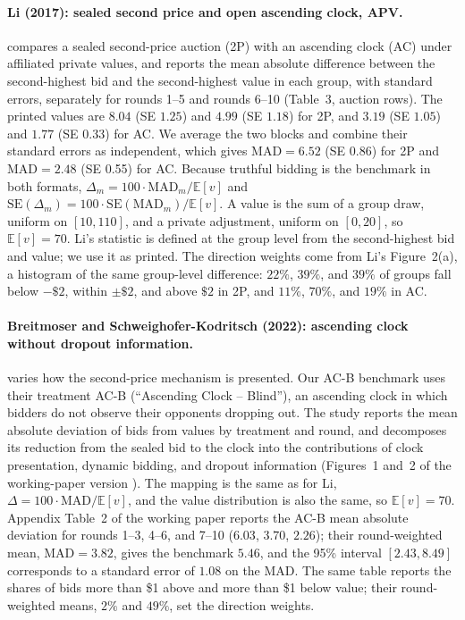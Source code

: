 \documentclass[acmsmall,screen,review]{acmart}
\newcommand{\rev}[1]{{\color{blue}#1}}
\newenvironment{revblock}{\color{blue}}{}
\newcommand{\rev}[1]{#1}
\newenvironment{revblock}{}{}
\begin{document}
\begin{revblock}
\paragraph{Li (2017): sealed second price and open ascending clock, APV.}
\citet{li2017obviously} compares a sealed second-price auction (2P) with an ascending clock (AC) under affiliated private values, and reports the mean absolute difference between the second-highest bid and the second-highest value in each group, with standard errors, separately for rounds 1--5 and rounds 6--10 (Table~3, auction rows). The printed values are $8.04$ (SE $1.25$) and $4.99$ (SE $1.18$) for 2P, and $3.19$ (SE $1.05$) and $1.77$ (SE $0.33$) for AC. We average the two blocks and combine their standard errors as independent, which gives $\mathrm{MAD}=6.52$ (SE 0.86) for 2P and $\mathrm{MAD}=2.48$ (SE 0.55) for AC. Because truthful bidding is the benchmark in both formats, $\Delta_m=100\cdot\mathrm{MAD}_m/\mathbb{E}[v]$ and $\mathrm{SE}(\Delta_m)=100\cdot\mathrm{SE}(\mathrm{MAD}_m)/\mathbb{E}[v]$. A value is the sum of a group draw, uniform on $[10,110]$, and a private adjustment, uniform on $[0,20]$, so $\mathbb{E}[v]=70$. Li's statistic is defined at the group level from the second-highest bid and value; we use it as printed. \rev{The direction weights come from Li's Figure~2(a), a histogram of the same group-level difference: $22\%$, $39\%$, and $39\%$ of groups fall below $-\$2$, within $\pm\$2$, and above $\$2$ in 2P, and $11\%$, $70\%$, and $19\%$ in AC.}

\paragraph{Breitmoser and Schweighofer-Kodritsch (2022): ascending clock without dropout information.}
\citet{breitmoser2022obviousness} varies how the second-price mechanism is presented. Our AC-B benchmark uses their treatment AC-B (``Ascending Clock -- Blind''), an ascending clock in which bidders do not observe their opponents dropping out. The study reports the mean absolute deviation of bids from values by treatment and round, and decomposes its reduction from the sealed bid to the clock into the contributions of clock presentation, dynamic bidding, and dropout information (Figures~1 and~2 of the working-paper version \citep{breitmoser2019obviousness}). The mapping is the same as for Li, $\Delta=100\cdot\mathrm{MAD}/\mathbb{E}[v]$, and the value distribution is also the same, so $\mathbb{E}[v]=70$. Appendix Table~2 of the working paper reports the AC-B mean absolute deviation for rounds 1--3, 4--6, and 7--10 ($6.03$, $3.70$, $2.26$); their round-weighted mean, $\mathrm{MAD}=3.82$, gives the benchmark $5.46$, and the 95\% interval $[2.43, 8.49]$ corresponds to a standard error of $1.08$ on the MAD. The same table reports the shares of bids more than \$1 above and more than \$1 below value; their round-weighted means, $2\%$ and $49\%$, set the direction weights.


\end{revblock}
\end{document}
